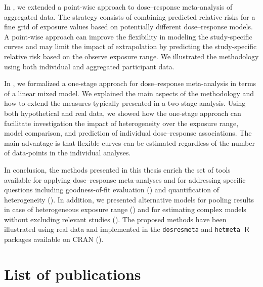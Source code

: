 \documentclass[11pt,a4paper,twoside,openany]{book}\usepackage{knitr}
\makeatletter
\def\cleardoublepage{\clearpage\if@twoside
\ifodd\c@page
\else\hbox{}\thispagestyle{empty}\newpage
\if@twocolumn\hbox{}\newpage\fi\fi\fi}
\DeclareMathOperator{\R}{\textsf{R}}
\makeatother
\begin{document}
{In , we extended a point-wise approach to dose--response meta-analysis of aggregated data. The strategy consists of combining predicted relative risks for a fine grid of exposure values based on potentially different dose--response models. A point-wise approach can improve the flexibility in modeling the study-specific curves and may limit the impact of extrapolation by predicting the study-specific relative risk based on the observe exposure range. We illustrated the methodology using both individual and aggregated participant data.

In , we formalized a one-stage approach for dose--response meta-analysis in terms of a linear mixed model. We explained the main aspects of the methodology and how to extend the measures typically presented in a two-stage analysis. Using both hypothetical and real data, we showed how the one-stage approach can facilitate investigation the impact of heterogeneity over the exposure range, model comparison, and prediction of individual dose--response associations. The main advantage is that flexible curves can be estimated regardless of the number of data-points in the individual analyses.

In conclusion, the methods presented in this thesis enrich the set of tools available for applying dose--response meta-analyses and for addressing specific questions including goodness-of-fit evaluation () and quantification of heterogeneity (). In addition, we presented alternative models for pooling results in case of heterogeneous exposure range () and for estimating complex models without excluding relevant studies (). The proposed methods have been illustrated using real data and implemented in the \texttt{dosresmeta} and \texttt{hetmeta} $\R$ packages available on CRAN (). 

\normalsize
\cleardoublepage

%

\chapter*{List of publications}

}
\end{document}
